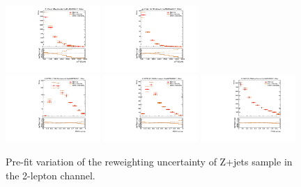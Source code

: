 \begin{figure}[H]
\begin{center}
 \includegraphics[width=0.32\textwidth,keepaspectratio]{figures/syst/Z_0ptag1pfat0pjet_0ptv_CRVjet_MTagMerJets_SysMJJREWEIGHT_100per.pdf}
 \includegraphics[width=0.32\textwidth,keepaspectratio]{figures/syst/Z_0ptag2pjet_0ptv_CRVjet_Fid_MTagResJets_SysMJJREWEIGHT_100per.pdf}
 \\
 \includegraphics[width=0.32\textwidth,keepaspectratio]{figures/syst/Z_0ptag1pfat0pjet_0ptv_SRVBS_HP_RNNScoreMerged_SysMJJREWEIGHT_100per.pdf}
 \includegraphics[width=0.32\textwidth,keepaspectratio]{figures/syst/Z_0ptag1pfat0pjet_0ptv_SRVBS_LP_RNNScoreMerged_SysMJJREWEIGHT_100per.pdf}
 \includegraphics[width=0.32\textwidth,keepaspectratio]{figures/syst/Z_0ptag2pjet_0ptv_SRVBS_Fid_RNNScoreResolved_SysMJJREWEIGHT_100per.pdf}
 \caption[f]{
Pre-fit variation of the reweighting uncertainty of Z+jets sample in the 2-lepton channel.
}
\label{fig:mjjreweighting}
\end{center}
\end{figure}

